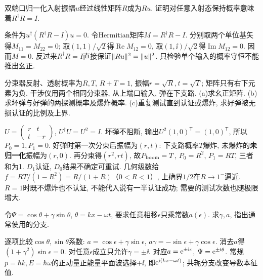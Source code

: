 \begin{exercise}
双端口归一化入射振幅$u$经过线性矩阵$R$成为$Ru$. 证明对任意入射态保持概率意味着$R^\dagger R=I$.
\end{exercise}
\begin{solution}
条件为$u^\dagger(R^\dagger R-I)u=0$. 令Hermitian矩阵$M=R^\dagger R-I$. 分别取两个单位基矢得$M_{11}=M_{22}=0$; 取$(1,1)/\sqrt2$得$\operatorname{Re}M_{12}=0$, 取$(1,\ii)/\sqrt2$得$\operatorname{Im}M_{12}=0$. 因而$M=0$. 反过来$R^\dagger R=I$直接保证$\lVert Ru\rVert^2=\lVert u\rVert^2$. 只检验单个输入的概率守恒不能推出幺正.
\end{solution}
\begin{exercise}
分束器反射、透射概率为$R,T$, $R+T=1$, 振幅$r=\sqrt R,t=\sqrt T$; 矩阵只有右下元素为负. 干涉仪用两个相同分束器, 从上端口输入, 弹在下支路. (a)求幺正矩阵. (b)求坏弹与好弹的两探测概率及爆炸概率. (c)重复测试直到认证或爆炸, 求好弹被无损认证的比例及上界.
\end{exercise}
\begin{solution}
$U=\left(\begin{smallmatrix}r&t\\t&-r\end{smallmatrix}\right)$, $U^\dagger U=U^2=I$. 坏弹不阻断, 输出$U^2(1,0)^{\mathsf T}=(1,0)^{\mathsf T}$, 所以$P_0=1,P_1=0$. 好弹时第一次分束后振幅为$(r,t)$: 下支路概率$T$爆炸, 未爆炸的\textbf{未归一化}振幅为$(r,0)$. 再分束得$(r^2,rt)$, 故$P_{\rm boom}=T$, $P_0=R^2$, $P_1=RT$, 三者和为1. $D_1$认证, $D_0$结果不确定可重试. 几何级数给$f=RT/(1-R^2)=R/(1+R)$（$0<R<1$）, 上确界$1/2$在$R\to1^-$逼近. $R=1$时既不爆炸也不认证, 不能代入说有一半认证成功; 需要的测试次数也随极限增大.
\end{solution}
\begin{exercise}
令$\Psi=\cos\theta+\gamma\sin\theta$, $\theta=kx-\omega t$, 要求任意相移$\epsilon$只乘常数$a(\epsilon)$. 求$\gamma,a$, 指出通常使用的分支.
\end{exercise}
\begin{solution}
逐项比较$\cos\theta,\sin\theta$系数:
$a=\cos\epsilon+\gamma\sin\epsilon$, $a\gamma=-\sin\epsilon+\gamma\cos\epsilon$. 消去$a$得$(1+\gamma^2)\sin\epsilon=0$. 对任意$\epsilon$成立只允许$\gamma=\pm\ii$. 对应$a=\mathrm e^{\pm\mathrm i\epsilon}$, $\Psi=\mathrm e^{\pm\mathrm i\theta}$. 常规$p=\hbar k,E=\hbar\omega$的正动量正能量平面波选择$+\ii$, 即$\mathrm e^{\mathrm i(kx-\omega t)}$; 共轭分支改变导数本征值.
\end{solution}
